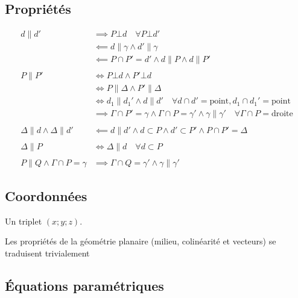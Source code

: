 \documentclass{article}
\begin{document}
\subsection{Propriétés}

\begin{equation*}
    \begin{split}
        d \parallel d' &\implies P \bot d \quad\forall P \bot d' \\
                       &\impliedby d \parallel \gamma \land d' \parallel \gamma \\
                       &\impliedby P \cap P' = d' \land d \parallel P \land d \parallel P' \\\\
        P \parallel P' &\iff P\bot d \land P' \bot d \\
                       &\iff P \parallel \Delta \land P' \parallel \Delta \\
                       &\iff d_1 \parallel d_1' \land d \parallel d' \quad\forall d \cap d' = \text{point}, d_1 \cap d_1' = \text{point} \\
                       &\implies \Gamma \cap P' = \gamma \land \Gamma \cap P = \gamma' \land \gamma \parallel \gamma' \quad\forall \Gamma \cap P = \text{droite} \\\\
        \Delta \parallel d \land \Delta \parallel d' &\impliedby d \parallel d' \land d \subset P \land d' \subset P' \land P \cap P' = \Delta \\\\
        \Delta \parallel P &\iff \Delta \parallel d \quad\forall d \subset P \\\\
        P \parallel Q \land \Gamma \cap P = \gamma &\implies \Gamma \cap Q = \gamma' \land \gamma \parallel \gamma'
    \end{split}
\end{equation*}

\subsection{Coordonnées}

Un triplet $(x; y; z)$.

Les propriétés de la géométrie planaire (milieu, colinéarité et vecteurs) se traduisent trivialement


\subsection{Équations paramétriques}
\end{document}
